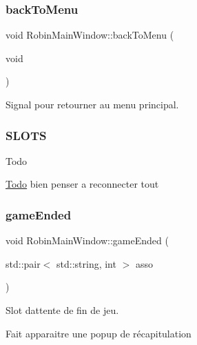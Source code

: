\subsubsection{\texorpdfstring{back\+To\+Menu}{backToMenu}}
{\footnotesize\ttfamily void Robin\+Main\+Window\+::back\+To\+Menu (\begin{DoxyParamCaption}\item[{void}]{ }\end{DoxyParamCaption})\hspace{0.3cm}{\ttfamily [slot]}}



Signal pour retourner au menu principal. 



 \subsubsection*{S\+L\+O\+TS }

\begin{DoxyRefDesc}{Todo}
\item[\hyperlink{todo__todo000021}{Todo}]bien penser a reconnecter tout \end{DoxyRefDesc}
\mbox{\label{class_robin_main_window_a08e1d2b660c03aa711d552258a368ec0}} 
\subsubsection{\texorpdfstring{game\+Ended}{gameEnded}}
{\footnotesize\ttfamily void Robin\+Main\+Window\+::game\+Ended (\begin{DoxyParamCaption}\item[{std\+::pair$<$ std\+::string, int $>$}]{asso }\end{DoxyParamCaption})\hspace{0.3cm}{\ttfamily [slot]}}



Slot d\textquotesingle{}attente de fin de jeu. 

Fait apparaitre une popup de récapitulation \mbox{\label{class_robin_main_window_a55e49d0a4d727066b553fc2277dd8a78}} 
